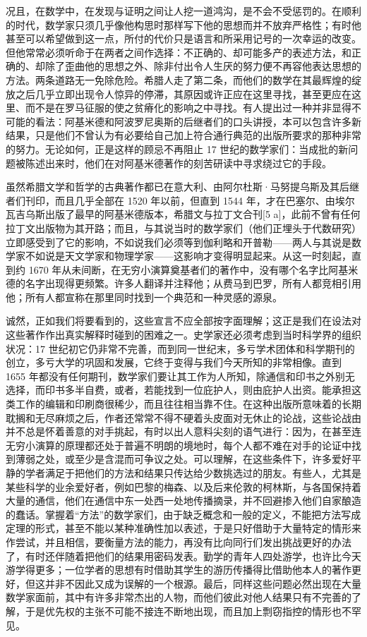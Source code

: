 况且，在数学中，在发现与证明之间让人挖一道鸿沟，是不会不受惩罚的。在顺利的时代，数学家只须几乎像他构思时那样写下他的思想而并不放弃严格性；有时他甚至可以希望做到这一点，所付的代价只是语言和所采用记号的一次幸运的改变。但他常常必须听命于在两者之间作选择：不正确的、却可能多产的表述方法，和正确的、却除了歪曲他的思想之外、除非付出令人生厌的努力便不再容他表达思想的方法。两条道路无一免除危险。希腊人走了第二条，而他们的数学在其最辉煌的绽放之后几乎立即出现令人惊异的停滞，其原因或许正应在这里寻找，甚至更应在这里、而不是在罗马征服的使之贫瘠化的影响之中寻找。有人提出过一种并非显得不可能的看法：阿基米德和阿波罗尼奥斯的后继者们的口头讲授，本可以包含许多新结果，只是他们不曾认为有必要给自己加上符合通行典范的出版所要求的那种非常的努力。无论如何，正是这样的顾忌不再阻止 17 世纪的数学家们：当成批的新问题被陈述出来时，他们在对阿基米德著作的刻苦研读中寻求绕过它的手段。

虽然希腊文学和哲学的古典著作都已在意大利、由阿尔杜斯·马努提乌斯及其后继者们刊印，而且几乎全部在 1520 年以前，但直到 1544 年，才在巴塞尔、由埃尔瓦吉乌斯出版了最早的阿基米德版本，希腊文与拉丁文合刊{[}5 a{]}，此前不曾有任何拉丁文出版物为其开路；而且，与其说当时的数学家们（他们正埋头于代数研究）立即感受到了它的影响，不如说我们必须等到伽利略和开普勒——两人与其说是数学家不如说是天文学家和物理学家——这影响才变得明显起来。从这一时刻起，直到约 1670 年从未间断，在无穷小演算奠基者们的著作中，没有哪个名字比阿基米德的名字出现得更频繁。许多人翻译并注释他；从费马到巴罗，所有人都竞相引用他；所有人都宣称在那里同时找到一个典范和一种灵感的源泉。

诚然，正如我们将要看到的，这些宣言不应全部按字面理解；这正是我们在设法对这些著作作出真实解释时碰到的困难之一。史学家还必须考虑到当时科学界的组织状况：17 世纪初它仍非常不完善，而到同一世纪末，多亏学术团体和科学期刊的创立，多亏大学的巩固和发展，它终于变得与我们今天所知的非常相像。直到 1655 年都没有任何期刊，数学家们要让其工作为人所知，除通信和印书之外别无选择，而印书多半自费，或者，若能找到一位庇护人，则由庇护人出资。能承担这类工作的编辑和印刷商很稀少，而且往往相当靠不住。在这种出版所意味着的长期耽搁和无尽麻烦之后，作者还常常不得不硬着头皮面对无休止的论战，这些论战由并不总是怀着善意的对手挑起，有时以出人意料尖刻的语气进行：因为，在甚至连无穷小演算的原理都还处于普遍不明朗的境地时，每个人都不难在对手的论证中找到薄弱之处，或至少是含混而可争议之处。可以理解，在这些条件下，许多爱好平静的学者满足于把他们的方法和结果只传达给少数挑选过的朋友。有些人，尤其是某些科学的业余爱好者，例如巴黎的梅森、以及后来伦敦的柯林斯，与各国保持着大量的通信，他们在通信中东一处西一处地传播摘录，并不回避掺入他们自家酿造的蠢话。掌握着“方法”的数学家们，由于缺乏概念和一般的定义，不能把方法写成定理的形式，甚至不能以某种准确性加以表述，于是只好借助于大量特定的情形来作尝试，并且相信，要衡量方法的能力，再没有比向同行们发出挑战更好的办法了，有时还伴随着把他们的结果用密码发表。勤学的青年人四处游学，也许比今天游学得更多；一位学者的思想有时借助其学生的游历传播得比借助他本人的著作更好，但这并非不因此又成为误解的一个根源。最后，同样这些问题必然出现在大量数学家面前，其中有许多非常杰出的人物，而他们彼此对他人结果只有不完善的了解，于是优先权的主张不可能不接连不断地出现，而且加上剽窃指控的情形也不罕见。

